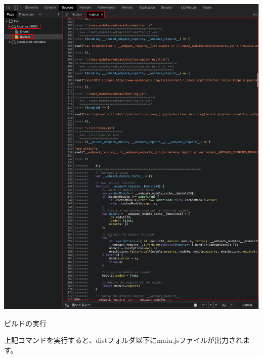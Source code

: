 \begin{reviewimage}%
\includegraphics[width=0.8\maxwidth]{./images/02-create-react-app/webpack_test02.png}%
\label{image:02-create-react-app:webpack_test02}
\end{reviewimage}

\clearpage

\def\startercodeblockfontsize{}
\begin{starterterminal}[]{ビルドの実行}\end{starterterminal}

上記コマンドを実行すると、distフォルダ以下にmain.jsファイルが出力されます。

